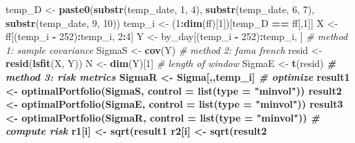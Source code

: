 \documentclass[11pt,]{article}
\newenvironment{Shaded}{\begin{snugshade}}{\end{snugshade}}
\newcommand{\CommentTok}[1]{\textcolor[rgb]{0.56,0.35,0.01}{\textit{#1}}}
\newcommand{\DataTypeTok}[1]{\textcolor[rgb]{0.13,0.29,0.53}{#1}}
\newcommand{\DecValTok}[1]{\textcolor[rgb]{0.00,0.00,0.81}{#1}}
\newcommand{\KeywordTok}[1]{\textcolor[rgb]{0.13,0.29,0.53}{\textbf{#1}}}
\newcommand{\NormalTok}[1]{#1}
\newcommand{\OperatorTok}[1]{\textcolor[rgb]{0.81,0.36,0.00}{\textbf{#1}}}
\newcommand{\StringTok}[1]{\textcolor[rgb]{0.31,0.60,0.02}{#1}}
\begin{document}
\begin{Shaded}
\begin{Highlighting}[]
{\NormalTok{  temp_D <-}\StringTok{ }\KeywordTok{paste0}\NormalTok{(}\KeywordTok{substr}\NormalTok{(temp_date, }\DecValTok{1}\NormalTok{, }\DecValTok{4}\NormalTok{),}
            \KeywordTok{substr}\NormalTok{(temp_date, }\DecValTok{6}\NormalTok{, }\DecValTok{7}\NormalTok{), }
            \KeywordTok{substr}\NormalTok{(temp_date, }\DecValTok{9}\NormalTok{, }\DecValTok{10}\NormalTok{))}
\NormalTok{  temp_i <-}\StringTok{ }\NormalTok{(}\DecValTok{1}\OperatorTok{:}\KeywordTok{dim}\NormalTok{(ff)[}\DecValTok{1}\NormalTok{])[temp_D }\OperatorTok{==}\StringTok{ }\NormalTok{ff[,}\DecValTok{1}\NormalTok{]]}
\NormalTok{  X <-}\StringTok{ }\NormalTok{ff[(temp_i }\OperatorTok{-}\StringTok{ }\DecValTok{252}\NormalTok{)}\OperatorTok{:}\NormalTok{temp_i, }\DecValTok{2}\OperatorTok{:}\DecValTok{4}\NormalTok{]}
\NormalTok{  Y <-}\StringTok{ }\NormalTok{by_day[(temp_i }\OperatorTok{-}\StringTok{ }\DecValTok{252}\NormalTok{)}\OperatorTok{:}\NormalTok{temp_i, ]}
  \CommentTok{# method 1: sample covariance }
\NormalTok{  SigmaS <-}\StringTok{ }\KeywordTok{cov}\NormalTok{(Y)}
  \CommentTok{# method 2: fama french  }
\NormalTok{  resid <-}\StringTok{ }\KeywordTok{resid}\NormalTok{(}\KeywordTok{lsfit}\NormalTok{(X, Y))}
\NormalTok{  N <-}\StringTok{ }\KeywordTok{dim}\NormalTok{(Y)[}\DecValTok{1}\NormalTok{] }\CommentTok{# length of window }
\NormalTok{  SigmaE <-}\StringTok{ }\KeywordTok{t}\NormalTok{(resid) }\OperatorTok{%
  \CommentTok{# method 3: risk metrics }
\NormalTok{  SigmaR <-}\StringTok{ }\NormalTok{Sigma[,,temp_i]}
  \CommentTok{# optimize  }
\NormalTok{  result1 <-}\StringTok{ }\KeywordTok{optimalPortfolio}\NormalTok{(SigmaS, }\DataTypeTok{control =} \KeywordTok{list}\NormalTok{(}\DataTypeTok{type =} \StringTok{"minvol"}\NormalTok{))}
\NormalTok{  result2 <-}\StringTok{ }\KeywordTok{optimalPortfolio}\NormalTok{(SigmaE, }\DataTypeTok{control =} \KeywordTok{list}\NormalTok{(}\DataTypeTok{type =} \StringTok{"minvol"}\NormalTok{))}
\NormalTok{  result3 <-}\StringTok{ }\KeywordTok{optimalPortfolio}\NormalTok{(SigmaR, }\DataTypeTok{control =} \KeywordTok{list}\NormalTok{(}\DataTypeTok{type =} \StringTok{"minvol"}\NormalTok{))}
  \CommentTok{# compute risk }
\NormalTok{  r1[i] <-}\StringTok{ }\KeywordTok{sqrt}\NormalTok{(result1 }\OperatorTok{%
\NormalTok{  r2[i] <-}\StringTok{ }\KeywordTok{sqrt}\NormalTok{(result2 }\OperatorTok{%
}}}}
\end{Highlighting}
\end{Shaded}
\end{document}
